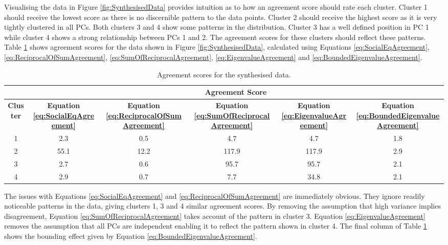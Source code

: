 			Visualising the data in Figure \ref{fig:SynthesisedData} provides intuition as to how an agreement
			score should rate each cluster. Cluster 1 should receive the lowest score as there is no
			discernible pattern to the data points. Cluster 2 should receive the highest score as it is very
			tightly clustered in all PCs. Both clusters 3 and 4 show some patterns in the distribution.
			Cluster 3 has a well defined position in PC 1 while cluster 4 shows a strong relationship between
			PCs 1 and 2. The agreement scores for these clusters should reflect these patterns. Table
			\ref{tab:SynthesisedDataAgreement} shows agreement scores for the data shown in Figure
			\ref{fig:SynthesisedData}, calculated using Equations \ref{eq:SocialEqAgreement},
			\ref{eq:ReciprocalOfSumAgreement}, \ref{eq:SumOfReciprocalAgreement}, \ref{eq:EigenvalueAgreement}
			and \ref{eq:BoundedEigenvalueAgreement}.

			\begin{table}[h!]
				\centering
				\begin{tabular}{|c|c|c|c|c|c|}
					\cline{2-6}
					\multicolumn{1}{c|}{} & \multicolumn{5}{c|}{\bf{Agreement Score}} \tabularnewline
					\hline
					\bf{Cluster} & \bf{Equation \ref{eq:SocialEqAgreement}} & 
					\bf{Equation \ref{eq:ReciprocalOfSumAgreement}} &
					\bf{Equation \ref{eq:SumOfReciprocalAgreement}} & 
					\bf{Equation \ref{eq:EigenvalueAgreement}} &
					\bf{Equation \ref{eq:BoundedEigenvalueAgreement}} \tabularnewline
					\hline
					\hline
					1 & 2.3 & 0.5 & 4.7 & 4.7 & 1.8 \tabularnewline
					\hline
					2 & 55.1 & 12.2 & 117.9 & 117.9 & 2.9 \tabularnewline
					\hline
					3 & 2.7 & 0.6 & 95.7 & 95.7 & 2.1 \tabularnewline
					\hline
					4 & 2.9 & 0.7 & 7.7 & 34.8 & 2.1 \tabularnewline
					\hline
				\end{tabular}
				\caption{Agreement scores for the synthesised data.}
				\label{tab:SynthesisedDataAgreement}
			\end{table}

			The issues with Equations \ref{eq:SocialEqAgreement} and \ref{eq:ReciprocalOfSumAgreement} are
			immediately obvious. They ignore readily noticeable patterns in the data, giving clusters 1, 3 and
			4 similar agreement scores. By removing the assumption that high variance implies disagreement,
			Equation \ref{eq:SumOfReciprocalAgreement} takes account of the pattern in cluster 3. Equation
			\ref{eq:EigenvalueAgreement} removes the assumption that all PCs are independent enabling it to
			reflect the pattern shown in cluster 4. The final column of Table
			\ref{tab:SynthesisedDataAgreement} shows the bounding effect given by Equation
			\ref{eq:BoundedEigenvalueAgreement}.

